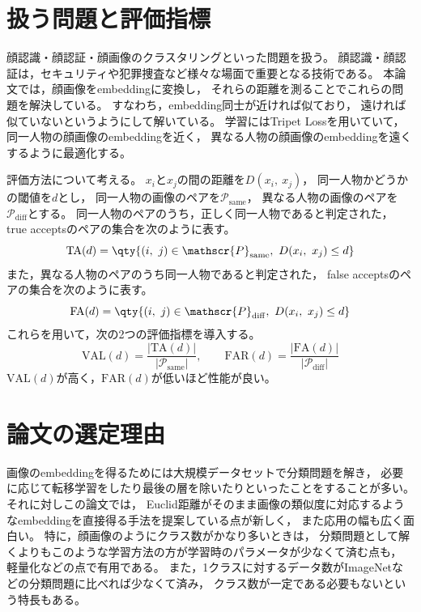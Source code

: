 \documentclass[dvipdfmx, fleqn]{jsarticle}
\begin{document}
\section{扱う問題と評価指標}

顔認識・顔認証・顔画像のクラスタリングといった問題を扱う。
顔認識・顔認証は，セキュリティや犯罪捜査など様々な場面で重要となる技術である。
本論文では，顔画像をembeddingに変換し，
それらの距離を測ることでこれらの問題を解決している。
すなわち，embedding同士が近ければ似ており，
遠ければ似ていないというようにして解いている。
学習にはTripet Lossを用いていて，
同一人物の顔画像のembeddingを近く，
異なる人物の顔画像のembeddingを遠くするように最適化する。

評価方法について考える。
\(x_i\)と\(x_j\)の間の距離を\(D(x_i,\ x_j)\)，
同一人物かどうかの閾値を\(d\)とし，
同一人物の画像のペアを\(\mathscr{P}_\mathrm{same}\)，
異なる人物の画像のペアを\(\mathscr{P}_\mathrm{diff}\)とする。
同一人物のペアのうち，正しく同一人物であると判定された，
true acceptsのペアの集合を次のように表す。
\begin{equation}
    \mathrm{TA}(d) = \qty{(i,\ j) \in \mathscr{P}_\mathrm{same},\ D(x_i,\ x_j) \le d}
\end{equation}
また，異なる人物のペアのうち同一人物であると判定された，
false acceptsのペアの集合を次のように表す。
\begin{equation}
    \mathrm{FA}(d) = \qty{(i,\ j) \in \mathscr{P}_\mathrm{diff},\ D(x_i,\ x_j) \le d}
\end{equation}
これらを用いて，次の2つの評価指標を導入する。
\begin{equation}
    \mathrm{VAL}(d) = \frac{|\mathrm{TA}(d)|}{|\mathscr{P}_\mathrm{same}|}
    , \qquad
    \mathrm{FAR}(d) = \frac{|\mathrm{FA}(d)|}{|\mathscr{P}_\mathrm{diff}|}
\end{equation}
\(\mathrm{VAL}(d)\)が高く，\(\mathrm{FAR}(d)\)が低いほど性能が良い。



\section{論文の選定理由}

画像のembeddingを得るためには大規模データセットで分類問題を解き，
必要に応じて転移学習をしたり最後の層を除いたりといったことをすることが多い。
それに対しこの論文では，
Euclid距離がそのまま画像の類似度に対応するようなembeddingを直接得る手法を提案している点が新しく，
また応用の幅も広く面白い。
特に，顔画像のようにクラス数がかなり多いときは，
分類問題として解くよりもこのような学習方法の方が学習時のパラメータが少なくて済む点も，
軽量化などの点で有用である。
また，1クラスに対するデータ数がImageNetなどの分類問題に比べれば少なくて済み，
クラス数が一定である必要もないという特長もある。
\end{document}
